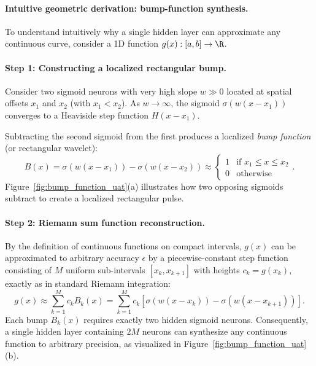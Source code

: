 \documentclass[../../main.tex]{subfiles}
\begin{document}
\paragraph{Intuitive geometric derivation: bump-function synthesis.}
To understand intuitively why a single hidden layer can approximate any continuous curve, consider a 1D function $g(x): [a, b] \to \R$.

\paragraph{Step 1: Constructing a localized rectangular bump.}
Consider two sigmoid neurons with very high slope $w \gg 0$ located at spatial offsets $x_1$ and $x_2$ (with $x_1 < x_2$). As $w \to \infty$, the sigmoid $\sigma(w(x - x_1))$ converges to a Heaviside step function $H(x - x_1)$. 

Subtracting the second sigmoid from the first produces a localized \emph{bump function} (or rectangular wavelet):
\begin{equation}
\label{eq:bump_construction}
B(x) = \sigma(w(x - x_1)) - \sigma(w(x - x_2)) \approx \begin{cases} 1 & \text{if } x_1 \le x \le x_2 \\ 0 & \text{otherwise} \end{cases}.
\end{equation}
Figure~\ref{fig:bump_function_uat}(a) illustrates how two opposing sigmoids subtract to create a localized rectangular pulse.

\paragraph{Step 2: Riemann sum function reconstruction.}
By the definition of continuous functions on compact intervals, $g(x)$ can be approximated to arbitrary accuracy $\epsilon$ by a piecewise-constant step function consisting of $M$ uniform sub-intervals $[x_k, x_{k+1}]$ with heights $c_k = g(x_k)$, exactly as in standard Riemann integration:
\begin{equation}
\label{eq:riemann_uat}
g(x) \approx \sum_{k=1}^M c_k B_k(x) = \sum_{k=1}^M c_k \left[ \sigma(w(x - x_k)) - \sigma(w(x - x_{k+1})) \right].
\end{equation}
Each bump $B_k(x)$ requires exactly two hidden sigmoid neurons. Consequently, a single hidden layer containing $2M$ neurons can synthesize any continuous function to arbitrary precision, as visualized in Figure~\ref{fig:bump_function_uat}(b).
\end{document}
